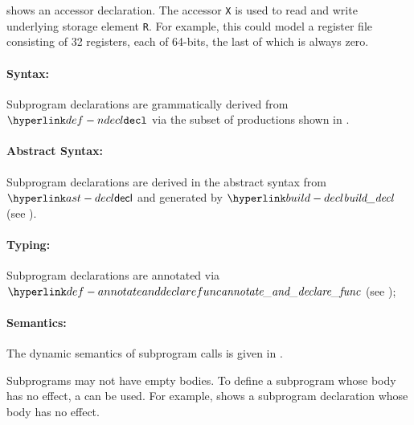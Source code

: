  shows an accessor declaration.
The accessor \texttt{X} is used to read and write underlying storage element \texttt{R}.
For example, this could model a register file consisting of 32 registers, each of 64-bits, the last of which is always zero.


\paragraph{Syntax:} Subprogram declarations are grammatically derived from $\Ndecl$ via the subset of productions shown in
  .

\paragraph{Abstract Syntax:} Subprogram declarations are derived in the abstract syntax from $\decl$
  and generated by $\builddecl$ (see ).

\paragraph{Typing:} Subprogram declarations are annotated via $\annotateanddeclarefunc$ (see );

\paragraph{Semantics:} The dynamic semantics of subprogram calls is given in .


Subprograms may not have empty bodies.
To define a subprogram whose body has no effect, a \passstatementterm{} can be used.
For example,  shows a subprogram declaration whose body has no effect.

